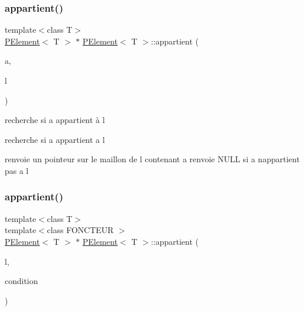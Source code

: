 \subsubsection{\texorpdfstring{appartient()}{appartient()}\hspace{0.1cm}{\footnotesize\ttfamily [1/2]}}
{\footnotesize\ttfamily template$<$class T$>$ \\
\mbox{\hyperlink{class_p_element}{P\+Element}}$<$ T $>$ $\ast$ \mbox{\hyperlink{class_p_element}{P\+Element}}$<$ T $>$\+::appartient (\begin{DoxyParamCaption}\item[{const T $\ast$}]{a,  }\item[{\mbox{\hyperlink{class_p_element}{P\+Element}}$<$ T $>$ $\ast$}]{l }\end{DoxyParamCaption})\hspace{0.3cm}{\ttfamily [static]}}



recherche si a appartient à l 

recherche si a appartient a l

renvoie un pointeur sur le maillon de l contenant a renvoie N\+U\+LL si a n\textquotesingle{}appartient pas a l \mbox{\label{class_p_element_ad1ad40db30605db39a57c08058cf444c}} 
\subsubsection{\texorpdfstring{appartient()}{appartient()}\hspace{0.1cm}{\footnotesize\ttfamily [2/2]}}
{\footnotesize\ttfamily template$<$class T$>$ \\
template$<$class F\+O\+N\+C\+T\+E\+UR $>$ \\
\mbox{\hyperlink{class_p_element}{P\+Element}}$<$ T $>$ $\ast$ \mbox{\hyperlink{class_p_element}{P\+Element}}$<$ T $>$\+::appartient (\begin{DoxyParamCaption}\item[{\mbox{\hyperlink{class_p_element}{P\+Element}}$<$ T $>$ $\ast$}]{l,  }\item[{const F\+O\+N\+C\+T\+E\+UR \&}]{condition }\end{DoxyParamCaption})\hspace{0.3cm}{\ttfamily [static]}}



